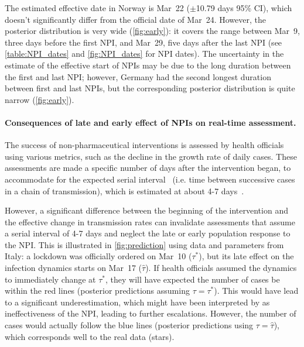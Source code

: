 \documentclass[12pt]{extarticle}
\begin{document}
The estimated effective date in Norway is Mar~22 ($\pm$10.79 days 95\% CI), which doesn't significantly differ from the official date of Mar~24.
However, the posterior distribution is very wide (\autoref{fig:early}): it covers the range between Mar~9, three days before the first NPI, and Mar~29, five days  after the last NPI (see 
\autoref{table:NPI_dates} and \autoref{fig:NPI_dates} for NPI dates).
The uncertainty in the estimate of the effective start of NPIs may be due to the long duration between the first and last NPI; however, Germany had the second longest duration between first and last NPIs, but the corresponding posterior distribution is quite narrow (\autoref{fig:early}).


\paragraph*{Consequences of late and early effect of NPIs on real-time assessment.}

The success of non-pharmaceutical interventions is assessed by health officials using various metrics, such as the decline in the growth rate of daily cases. These assessments are made a specific number of days after the intervention began, to accommodate for the expected serial interval~\citep{Banholzer2020} (i.e. time between successive cases in a chain of transmission), which is estimated at about 4-7 days~\citep{Gatto2020}. %

However, a significant difference between the beginning of the intervention and the effective change in transmission rates can invalidate assessments that assume a serial interval of 4-7 days and neglect the late or early population response to the NPI.
This is illustrated in \autoref{fig:prediction} using data and parameters from Italy: a lockdown was officially ordered on Mar~10 ($\tau^*$), but its late effect on the infection dynamics starts on Mar~17 ($\hat{\tau}$). If health officials assumed the dynamics to immediately change at $\tau^*$, they will have expected the number of cases be within the red lines (posterior predictions assuming $\tau=\tau^*$).
This would have lead to a significant underestimation, which might have been interpreted by as ineffectiveness of the NPI, leading to further escalations.
However, the number of cases would actually follow the blue lines (posterior predictions using $\tau=\hat{\tau}$), which corresponds well to the real data (stars).
\end{document}
